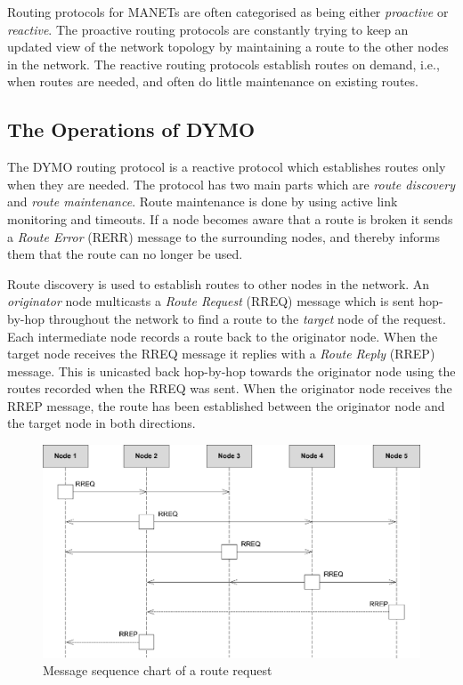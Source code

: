 Routing protocols for MANETs are often categorised as being either \emph{proactive} or \emph{reactive}. The proactive routing protocols are constantly trying to keep an updated view of the network topology by maintaining a route to the other nodes in the network. The reactive routing protocols establish routes on demand, i.e., when routes are needed, and often do little maintenance on existing routes.

\subsection{The Operations of DYMO}
The DYMO routing protocol is a reactive protocol which establishes routes only when they are needed. The protocol has two main parts which are \emph{route discovery} and \emph{route maintenance}. Route maintenance is done by using active link monitoring and timeouts. If a node becomes aware that a route is broken it sends a \emph{Route Error} (RERR) message to the surrounding nodes, and thereby informs them that the route can no longer be used.

Route discovery is used to establish routes to other nodes in the network. An \emph{originator} node multicasts a \emph{Route Request} (RREQ) message which is sent hop-by-hop throughout the network to find a route to the \emph{target} node of the request. Each intermediate node records a route back to the originator node. When the target node receives the RREQ message it replies with a \emph{Route Reply} (RREP) message. This is unicasted back hop-by-hop towards the originator node using the routes recorded when the RREQ was sent. When the originator node receives the RREP message, the route has been established between the originator node and the target node in both directions.


\begin{figure}
\centering
\includegraphics[width=\textwidth]{dymo/graphics/mscdymoex.eps}
\caption{Message sequence chart of a route request}
\label{fig:mscrreq}
\end{figure}

